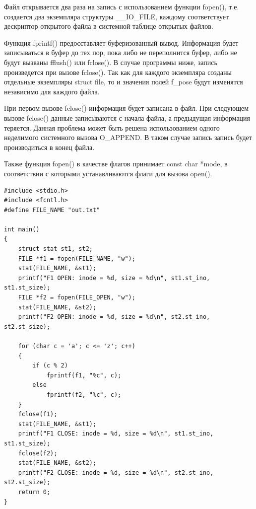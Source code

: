 \documentclass[14pt,a4paper]{scrreprt}
\begin{document}
Файл открывается два раза на запись с использованием функции fopen(), т.е. создается два экземпляра структуры \_\_IO\_FILE, каждому соответствует дескриптор открытого файла в системной таблице открытых файлов. 

Функция fprintf() предосставляет буферизованный вывод. Информация будет записываться в буфер до тех пор, пока либо не переполнится буфер, либо не будут вызваны fflush() или fclose(). В случае программы ниже, запись произведется при вызове fclose(). Так как для каждого экземпляра созданы отдельные экземпляры struct file, то и значения полей f\_pose будут изменятся независимо для каждого файла. 

При первом вызове fclose() информация будет записана в файл. При следующем вызове fclose() данные записываются с начала файла, а предыдущая информация теряется. Данная проблема может быть решена использованием одного неделимого системного вызова O\_APPEND. В таком случае запись запись будет производиться в конец файла.

Также функция fopen() в качестве флагов принимает const char *mode, в соответствии с которыми устанавливаются флаги для вызова open().

\begin{lstlisting}[caption=Исходная программа]
#include <stdio.h>
#include <fcntl.h>
#define FILE_NAME "out.txt"

int main()
{
	struct stat st1, st2;
	FILE *f1 = fopen(FILE_NAME, "w");
	stat(FILE_NAME, &st1);
	printf("F1 OPEN: inode = %d, size = %d\n", st1.st_ino, st1.st_size);
	FILE *f2 = fopen(FILE_OPEN, "w");
	stat(FILE_NAME, &st2);
	printf("F2 OPEN: inode = %d, size = %d\n", st2.st_ino, st2.st_size);
	
	for (char c = 'a'; c <= 'z'; c++)
	{
		if (c % 2)
			fprintf(f1, "%c", c);
		else
			fprintf(f2, "%c", c);
	}
	fclose(f1);
	stat(FILE_NAME, &st1);
	printf("F1 CLOSE: inode = %d, size = %d\n", st1.st_ino, st1.st_size);
	fclose(f2);
	stat(FILE_NAME, &st2);
	printf("F2 CLOSE: inode = %d, size = %d\n", st2.st_ino, st2.st_size);
	return 0;
}
\end{lstlisting}
\end{document}
